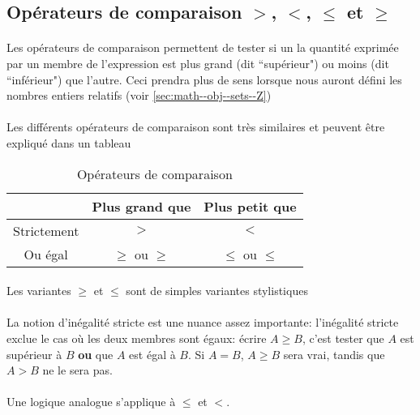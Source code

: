 \documentclass[a4paper]{book}
\begin{document}
    \paragraph{}
    \subsection{Opérateurs de comparaison $>$, $<$, $\leq$ et $\geq$}
    \paragraph{}
    Les opérateurs de comparaison permettent de tester si un la quantité exprimée par un membre de l'expression est plus grand (dit ``supérieur") ou moins (dit ``inférieur") que l'autre. Ceci prendra plus de sens lorsque nous auront défini les nombres entiers relatifs (voir \ref{sec:math--obj--sets--Z})
    \paragraph{}
    Les différents opérateurs de comparaison sont très similaires et peuvent être expliqué dans un tableau
    \begin{table}[H]
      \centering
      \begin{tabular}{c|cc}
        & Plus grand que        & Plus petit que         \\\hline
        Strictement & $>$                   & $<$                    \\
        Ou égal     & $\geq$ ou $\geqslant$ & $\leq$ ou $\leqslant$
      \end{tabular}
      \caption{Opérateurs de comparaison}
      \label{tab:comparison-operators}
    \end{table}
    \paragraph{}
    \small Les variantes $\geqslant$ et $\leqslant$ sont de simples variantes stylistiques
    \paragraph{}
    La notion d'inégalité stricte est une nuance assez importante: l'inégalité stricte exclue le cas où les deux membres sont égaux:
    écrire $A \geq B$, c'est tester que $A$ est supérieur à $B$ \textbf{ou} que $A$ est égal à $B$. Si $A = B$, $A \geq B$ sera vrai, tandis que $A > B$ ne le sera pas.
    \paragraph{}
    Une logique analogue s'applique à $\leq$ et $<$.
    
\end{document}
